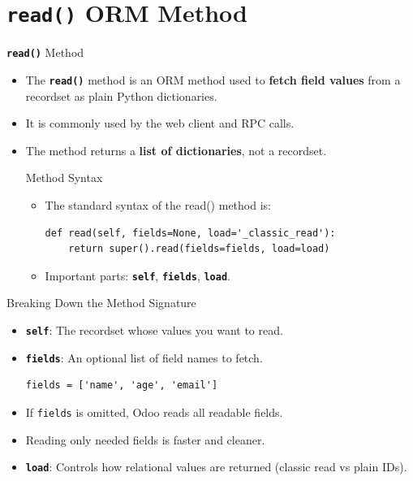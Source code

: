
\section{\textbf{\texttt{read()}} ORM Method}

\begin{frame}[fragile]{\textbf{\texttt{read()}} Method}
	\begin{itemize}
		\item The \textbf{\texttt{read()}} method is an ORM method used to \textbf{fetch field values} from a recordset as plain Python dictionaries.
		\item It is commonly used by the web client and RPC calls.
		\item The method returns a \textbf{list of dictionaries}, not a recordset.
\begin{block}{Method Syntax}
	\begin{itemize}
		\item The standard syntax of the read() method is:
\begin{lstlisting}
def read(self, fields=None, load='_classic_read'):
	return super().read(fields=fields, load=load)
\end{lstlisting}
		\item Important parts: \textbf{\texttt{self}}, \textbf{\texttt{fields}}, \textbf{\texttt{load}}.
	\end{itemize}
\end{block}
	\end{itemize}
\end{frame}

\begin{frame}[fragile]{Breaking Down the Method Signature}
	\begin{block}{}
		\begin{itemize}
			\item \textbf{\texttt{self}}: The recordset whose values you want to read.
			\item \textbf{\texttt{fields}}: An optional list of field names to fetch.
\begin{lstlisting}
fields = ['name', 'age', 'email']
\end{lstlisting}
			\item If \texttt{fields} is omitted, Odoo reads all readable fields.
			\item Reading only needed fields is faster and cleaner.
			\item \textbf{\texttt{load}}: Controls how relational values are returned (classic read vs plain IDs).
		\end{itemize}
	\end{block}
\end{frame}

